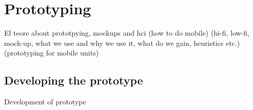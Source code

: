 \section{Prototyping}
El teore about prototpying, mockups and hci (how to do mobile)
(hi-fi, low-fi, mock-up, what we use and why we use it, what do we gain, heuristics etc.)
(prototyping for mobile units)

\subsection{Developing the prototype}
Development of prototype